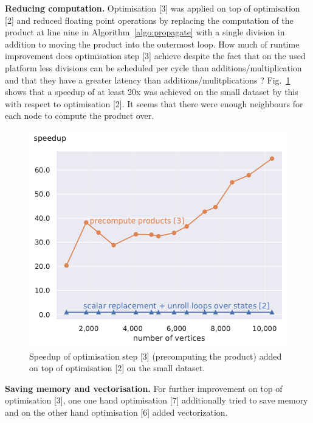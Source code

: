 \documentclass[letterpaper]{article}
\newcommand{\mypar}[1]{{\bf #1.}}
\begin{document}
\mypar{Reducing computation} Optimisation [3] was applied on top of optimisation [2] and reduced floating point operations by replacing the computation of the product at line nine in Algorithm~\ref{algo:propagate} with a single division in addition to moving the product into the outermost loop.
How much of runtime improvement does optimisation step [3] achieve despite the fact that on the used platform less divisions can be scheduled per cycle than additions/multiplication and that they have a greater latency than additions/mulitplications \cite{optimisationManual}?
Fig.~\ref{precomputeSpeedupSmall} shows that a speedup of at least 20x was achieved on the small dataset by this with respect to optimisation [2].
It seems that there were enough neighbours for each node to compute the product over.
\begin{figure}\centering
	\includegraphics[scale=0.58]{img/speedup[2][3]_small.pdf}
	\caption{Speedup of optimisation step [3] (precomputing the product) added on top of optimisation [2] on the small dataset. \label{precomputeSpeedupSmall}}
\end{figure}
\mypar{Saving memory and vectorisation} 
For further improvement on top of optimisation [3], one one hand optimisation [7] additionally tried to save memory and on the other hand optimisation [6] added vectorization.
\end{document}
